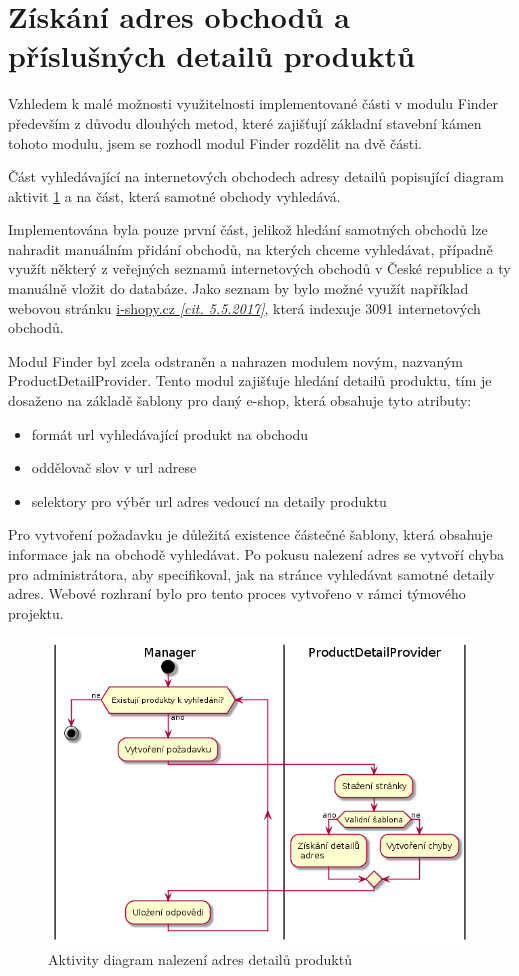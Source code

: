 \documentclass[thesis=B,czech]{FITthesis}[2012/06/26]
\begin{document}
\section{Získání adres obchodů a příslušných detailů produktů}
Vzhledem k malé možnosti využitelnosti implementované části v modulu Finder především z důvodu dlouhých metod, které zajišťují
základní stavební kámen tohoto modulu, jsem se rozhodl modul Finder rozdělit na dvě části.
\par
Část vyhledávající na internetových obchodech adresy detailů popisující diagram aktivit \ref{fig:pdp-diagram} a na část, která samotné obchody vyhledává.
\par
Implementována byla pouze první část, jelikož hledání samotných obchodů lze nahradit manuálním přidání obchodů, na kterých chceme vyhledávat, případně využít některý z veřejných seznamů internetových obchodů v České republice a ty manuálně vložit do databáze.
Jako seznam by bylo možné využít například webovou stránku \href{http://www.i-shopy.cz/}{i-shopy.cz \textit{[cit. 5.5.2017]}}, která indexuje 3091 internetových obchodů.
\par
Modul Finder byl zcela odstraněn a nahrazen modulem novým, nazvaným ProductDetailProvider.
Tento modul zajišťuje hledání detailů produktu, tím je dosaženo na základě šablony pro daný e-shop, která obsahuje 
tyto atributy:
\begin{itemize}
\item formát url vyhledávající produkt na obchodu
\item oddělovač slov v url adrese
\item selektory pro výběr url adres vedoucí na detaily produktu
\end{itemize}
Pro vytvoření požadavku je důležitá existence částečné šablony, která obsahuje informace jak na obchodě vyhledávat.
Po pokusu nalezení adres se vytvoří chyba pro administrátora, aby specifikoval, jak na stránce vyhledávat samotné detaily adres. Webové rozhraní
bylo pro tento proces vytvořeno v rámci týmového projektu.

\begin{figure}\centering
 	\includegraphics[width=1.0\textwidth]{resources/pdp-activity}
	\caption[Aktivity diagram nalezení adres detailů produktů]{
	Aktivity diagram nalezení adres detailů produktů}\label{fig:pdp-diagram}
\end{figure}
\end{document}
